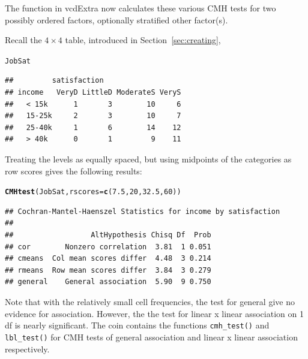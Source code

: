 \documentclass[10pt,twoside]{article}\usepackage[]{graphicx}\usepackage[]{color}
\makeatletter
\newcommand{\hlnum}[1]{\textcolor[rgb]{0.686,0.059,0.569}{#1}}%
\newcommand{\hlstd}[1]{\textcolor[rgb]{0.345,0.345,0.345}{#1}}%
\newcommand{\hlkwc}[1]{\textcolor[rgb]{0.333,0.667,0.333}{#1}}%
\newcommand{\hlkwd}[1]{\textcolor[rgb]{0.737,0.353,0.396}{\textbf{#1}}}%
\newenvironment{kframe}{%
 \def\at@end@of@kframe{}%
 \ifinner\ifhmode%
  \def\at@end@of@kframe{\end{minipage}}%
  \begin{minipage}{\columnwidth}%
 \fi\fi%
 \def\FrameCommand##1{\hskip\@totalleftmargin \hskip-\fboxsep
 \colorbox{shadecolor}{##1}\hskip-\fboxsep
     \hskip-\linewidth \hskip-\@totalleftmargin \hskip\columnwidth}%
 \MakeFramed {\advance\hsize-\width
   \@totalleftmargin\z@ \linewidth\hsize
   \@setminipage}}%
 {\par\unskip\endMakeFramed%
 \at@end@of@kframe}
\newenvironment{knitrout}{}{} %
\newcommand{\secref}[1]{Section~\ref{#1}}
\newcommand*{\Example}{\fbox{\textbf{\emph{Example}}:} }
\newcommand{\codefun}[1]{\code{#1()}}
\newcommand{\pkg}[1]{{\normalfont\fontseries{b}\selectfont #1}}
\makeatother
\begin{document}
The \codefun{CMHtest} function in \pkg{vcdExtra} now calculates these various
CMH tests for two possibly ordered factors, optionally stratified other factor(s).

\Example
Recall the $4 \times 4$ table,  introduced in \secref{sec:creating},
\begin{knitrout}
\color{fgcolor}\begin{kframe}
\begin{alltt}
\hlstd{JobSat}
\end{alltt}
\begin{verbatim}
##         satisfaction
## income   VeryD LittleD ModerateS VeryS
##   < 15k      1       3        10     6
##   15-25k     2       3        10     7
##   25-40k     1       6        14    12
##   > 40k      0       1         9    11
\end{verbatim}
\end{kframe}
\end{knitrout}


Treating the  levels as equally spaced, but using
midpoints of the  categories as row scores gives the following results:
\begin{knitrout}
\color{fgcolor}\begin{kframe}
\begin{alltt}
\hlkwd{CMHtest}\hlstd{(JobSat,} \hlkwc{rscores}\hlstd{=}\hlkwd{c}\hlstd{(}\hlnum{7.5}\hlstd{,}\hlnum{20}\hlstd{,}\hlnum{32.5}\hlstd{,}\hlnum{60}\hlstd{))}
\end{alltt}
\begin{verbatim}
## Cochran-Mantel-Haenszel Statistics for income by satisfaction 
## 
##                  AltHypothesis Chisq Df  Prob
## cor        Nonzero correlation  3.81  1 0.051
## cmeans  Col mean scores differ  4.48  3 0.214
## rmeans  Row mean scores differ  3.84  3 0.279
## general    General association  5.90  9 0.750
\end{verbatim}
\end{kframe}
\end{knitrout}


Note that with the relatively small cell frequencies, the test for general 
give no evidence for association. However, the the  test for linear x linear
association on 1 df is nearly significant. The \pkg{coin} contains the
functions \verb|cmh_test()| and \verb|lbl_test()|
for CMH tests of general association and linear x linear association respectively.
\end{document}
